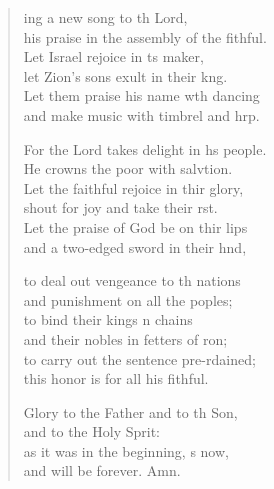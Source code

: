 \begin{verse}
  \begin{patverse}
    ing a new song to th Lord,\Med\\
his praise in the assembly of the fithful.\\
Let Israel rejoice in \pointup{\i}ts maker,\Med\\
let Zion’s sons exult in their k\pointup{\i}ng.\\
Let them praise his name w\pointup{\i}th dancing\Med\\
and make music with timbrel and hrp.

For the Lord takes delight in h\pointup{\i}s people.\Med\\
He crowns the poor with salvtion.\\
Let the faithful rejoice in thir glory,\Med\\
shout for joy and take their rst.\\
Let the praise of God be on thir lips\Med\\
and a two-edged sword in their hnd,

to deal out vengeance to th nations\Med\\
and punishment on all the poples;\\
to bind their kings \pointup{\i}n chains\Med\\
and their nobles in fetters of \pointup{\i}ron;\\
to carry out the sentence pre-rdained;\Med\\
this honor is for all his fithful.

Glory to the Father and to th Son,\Med\\
and to the Holy Sp\pointup{\i}rit:\\
as it was in the beginning, \pointup{\i}s now,\Med\\
and will be forever. Amn.
  \end{patverse}
\end{verse}
